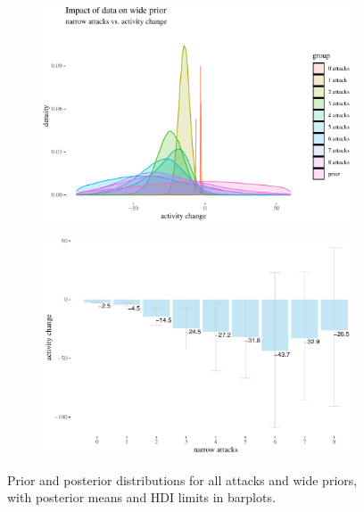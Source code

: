 \documentclass[10pt,]{scrartcl}
\begin{document}
\begin{figure}[!ht]
\begin{subfigure}[!ht]{0.9\textwidth}

\begin{center}\includegraphics[width=1\linewidth]{redditAnalysisWalkthrough_files/figure-latex/unnamed-chunk-58-1} \end{center}
\end{subfigure} 


\begin{subfigure}[!ht]{0.9\textwidth}

\begin{center}\includegraphics[width=1\linewidth]{redditAnalysisWalkthrough_files/figure-latex/unnamed-chunk-59-1} \end{center}
\end{subfigure}


\caption{Prior and posterior distributions for all attacks and wide priors, with posterior means and HDI limits in barplots.}
\label{fig:bayesian1}
\end{figure}
\end{document}

